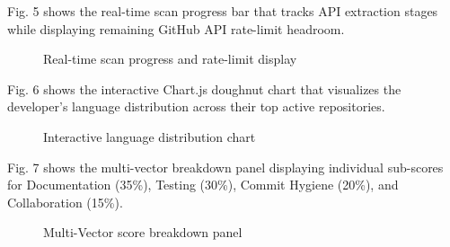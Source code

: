 \documentclass[12pt,a4paper]{article}
\begin{document}
\newpage
\thispagestyle{fancy}
\noindent Fig. 5 shows the real-time scan progress bar that tracks API extraction stages while displaying remaining GitHub API rate-limit headroom.

\begin{figure}[h!]
\centering
\vspace{0.3cm}
\vspace{0.3cm}
\caption{Real-time scan progress and rate-limit display}
\end{figure}

\noindent Fig. 6 shows the interactive Chart.js doughnut chart that visualizes the developer's language distribution across their top active repositories.

\begin{figure}[h!]
\centering
\vspace{0.3cm}
\vspace{0.3cm}
\caption{Interactive language distribution chart}
\end{figure}

\newpage
\thispagestyle{fancy}
\noindent Fig. 7 shows the multi-vector breakdown panel displaying individual sub-scores for Documentation (35\%), Testing (30\%), Commit Hygiene (20\%), and Collaboration (15\%).

\begin{figure}[h!]
\centering
\vspace{0.3cm}
\vspace{0.3cm}
\caption{Multi-Vector score breakdown panel}
\end{figure}
\end{document}
